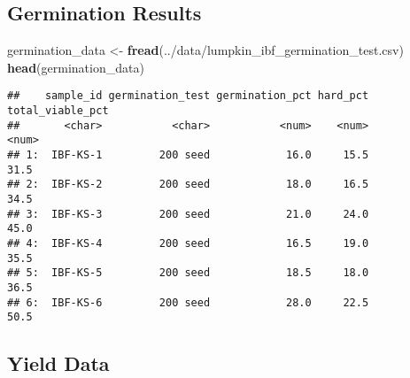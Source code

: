 \documentclass[
]{article}
\newenvironment{Shaded}{\begin{snugshade}}{\end{snugshade}}
\newcommand{\FunctionTok}[1]{\textcolor[rgb]{0.13,0.29,0.53}{\textbf{#1}}}
\newcommand{\NormalTok}[1]{#1}
\newcommand{\OtherTok}[1]{\textcolor[rgb]{0.56,0.35,0.01}{#1}}
\newcommand{\StringTok}[1]{\textcolor[rgb]{0.31,0.60,0.02}{#1}}
\begin{document}
\subsection{Germination Results}\label{germination-results}

\begin{Shaded}
\begin{Highlighting}[]
\NormalTok{germination\_data }\OtherTok{\textless{}{-}} \FunctionTok{fread}\NormalTok{(}\StringTok{\textquotesingle{}../data/lumpkin\_ibf\_germination\_test.csv\textquotesingle{}}\NormalTok{)}
\FunctionTok{head}\NormalTok{(germination\_data)}
\end{Highlighting}
\end{Shaded}

\begin{verbatim}
##    sample_id germination_test germination_pct hard_pct total_viable_pct
##       <char>           <char>           <num>    <num>            <num>
## 1:  IBF-KS-1         200 seed            16.0     15.5             31.5
## 2:  IBF-KS-2         200 seed            18.0     16.5             34.5
## 3:  IBF-KS-3         200 seed            21.0     24.0             45.0
## 4:  IBF-KS-4         200 seed            16.5     19.0             35.5
## 5:  IBF-KS-5         200 seed            18.5     18.0             36.5
## 6:  IBF-KS-6         200 seed            28.0     22.5             50.5
\end{verbatim}

\subsection{Yield Data}\label{yield-data}
\end{document}
